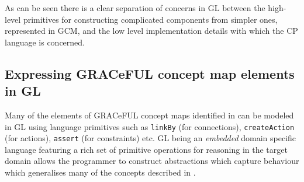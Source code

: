 As can be seen there is a clear separation of concerns in GL between the high-level primitives
for constructing complicated components from simpler ones, represented in GCM, and the low level
implementation details with which the CP language is concerned.

\subsection{Expressing GRACeFUL concept map elements in GL}
Many of the elements of GRACeFUL concept maps identified in \cite{d4.1} can be modeled in
GL using language primitives such as \texttt{linkBy} (for connections),
\texttt{createAction} (for actions), \texttt{assert} (for constraints) etc.
GL being an \textit{embedded} domain specific language featuring a rich set of primitive
operations for reasoning in the target domain allows the programmer to construct
abstractions which capture behaviour which generalises many of the concepts described
in \cite{d4.1}.
